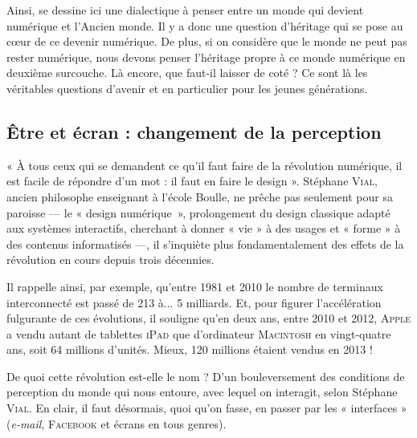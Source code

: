 Ainsi, se dessine ici une dialectique à penser entre un monde qui devient numérique et l'Ancien monde. Il y a donc une question d'héritage qui se pose au cœur de ce devenir numérique. De plus, si on considère que le monde ne peut pas rester numérique, nous devons penser l'héritage propre à ce monde numérique en deuxième surcouche. Là encore, que faut-il laisser de coté ? Ce sont là les véritables questions d'avenir et en particulier pour les jeunes générations.



\subsection[Être et écran]{Être et écran : changement de la perception}
\label{sub:II.4.2}

« À tous ceux qui se demandent ce qu’il faut faire de la révolution numérique, il est facile de répondre d’un mot : il faut en faire le design ». Stéphane \textsc{Vial}, ancien philosophe enseignant à l’école Boulle, ne prêche pas seulement pour sa paroisse --- le « design numérique~», prolongement du design classique adapté aux systèmes interactifs, cherchant à donner « vie » à des usages et « forme » à des contenus informatisés ---, il s’inquiète plus fondamentalement des effets de la révolution en cours depuis trois décennies.

Il rappelle ainsi, par exemple, qu’entre 1981 et 2010 le nombre de terminaux interconnecté est passé de 213 à... 5 milliards. Et, pour figurer l’accélération fulgurante de ces évolutions, il souligne qu’en deux ans, entre 2010 et 2012, \textsc{Apple} a vendu autant de tablettes \textsc{iPad} que d’ordinateur \textsc{Macintosh} en vingt-quatre ans, soit 64 millions d’unités. Mieux, 120 millions étaient vendus en 2013 !

De quoi cette révolution est-elle le nom ? D’un bouleversement des conditions de perception du monde qui nous entoure, avec lequel on interagit, selon Stéphane \textsc{Vial}. En clair, il faut désormais, quoi qu’on fasse, en passer par les « interfaces » (\textit{e-mail}, \textsc{Facebook} et écrans en tous genres).



